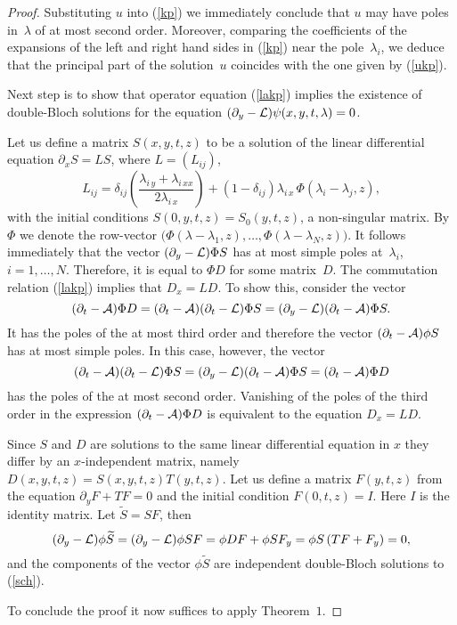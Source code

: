 \documentclass[a4paper,11pt]{article}
\newcommand{\p}{\partial}
\newcommand{\wt}{\widetilde}
\newcommand{\cL}{{\cal L}}
\newcommand{\cA}{{\cal A}}
\theoremstyle{plain}
\theoremstyle{remark}
\begin{document}
\begin{proof}
Substituting $u$ into (\ref{kp}) we immediately conclude that $u$ may have poles
in~$\lambda$ of at most second order. Moreover, comparing the coefficients
of the expansions of the left and right hand sides in (\ref{kp}) near the
pole~$\lambda_i$, we deduce that the principal part of the solution~$u$ coincides
with the one given by (\ref{ukp}).

Next step is to show that operator equation (\ref{lakp}) implies
the existence of double-Bloch solutions for the equation
$(\p_y-\cL)\psi(x,y,t,\lambda)=0$.

Let us define a matrix $S(x,y,t,z)$ to be a solution of the linear differential
equation $\p_x S=L S$, where $L=(L_{ij})$,
$$
L_{ij} =\delta_{ij}\left(
\frac{\lambda_{i\,y}+\lambda_{i\,xx}}{2\lambda_{i\,x}}
\right)+(1-\delta_{ij}) \lambda_{i\,x}\, \Phi(\lambda_i-\lambda_j,z) ,
$$
with the initial conditions $S(0,y,t,z)=S_0(y,t,z)$, a non-singular matrix.
By $\Phi$ we denote the row-vector
$\bigl( \Phi(\lambda-\lambda_1,z),\dots,\Phi(\lambda-\lambda_N,z) \bigr)$.
It follows immediately that the vector $(\p_y-\cL)\Phi S$ has at most simple
poles at~$\lambda_i$, $i=1,\dots,N$. Therefore, it is equal to $\Phi D$ for
some matrix~$D$. The commutation relation (\ref{lakp}) implies that
$D_x= L D$. To show this, consider the vector
$$
(\p_t-\cA)\Phi D=(\p_t-\cA)(\p_t-\cL)\Phi S=(\p_y-\cL)(\p_t-\cA)\Phi S.
$$
It has the poles of the at most third order and therefore the vector
$(\p_t-\cA)\phi S$ has at most simple poles. In this case, however, the vector
$$
(\p_t-\cA)(\p_t-\cL)\Phi S=(\p_y-\cL)(\p_t-\cA)\Phi S=(\p_t-\cA)\Phi D
$$
has the poles of the at most second order. Vanishing of the poles of the third order
in the expression $(\p_t-\cA)\Phi D$ is equivalent to the equation $D_x=LD$.

Since $S$ and $D$ are solutions to the same linear differential equation in $x$ they
differ by an $x$-independent matrix, namely $D(x,y,t,z)=S(x,y,t,z)T(y,t,z)$.
Let us define a matrix $F(y,t,z)$ from the equation $\p_y F+T F=0$ and the
initial condition $F(0,t,z)=I$. Here $I$ is the identity matrix.
Let $\wt S=S F$, then
$$
(\p_y-\cL)\phi\wt S=(\p_y-\cL)\phi S F=\phi D F+\phi S F_y=
\phi S\left(T F+F_y\right)=0,
$$
and the components of the vector $\phi\wt S$ are independent double-Bloch solutions
to (\ref{sch}).

To conclude the proof it now suffices to apply Theorem~$1$.
\end{proof}

\end{document}
